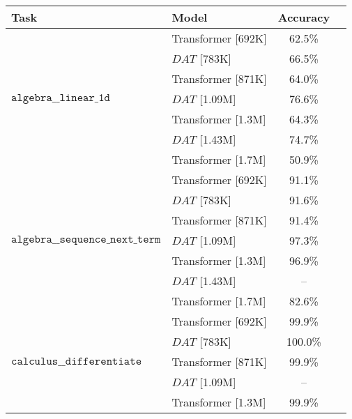 \begin{tabular}{l|l|cc}
    \toprule
    Task & Model &  Accuracy \\
    \midrule
    \multirow{7}{*}{$\texttt{algebra\_\_linear\_1d}$} & Transformer [692K] &                    62.5\% \\
                                     & $DAT$ [783K] &                    66.5\% \\
                                     & Transformer [871K] &                    64.0\% \\
                                     & $DAT$ [1.09M] &                    76.6\% \\
                                     & Transformer [1.3M] &                    64.3\% \\
                                     & $DAT$ [1.43M] &                    74.7\% \\
                                     & Transformer [1.7M] &                    50.9\% \\
    \cline{1-3}
    \multirow{7}{*}{$\texttt{algebra\_\_sequence\_next\_term}$} & Transformer [692K] &                    91.1\% \\
                                     & $DAT$ [783K] &                    91.6\% \\
                                     & Transformer [871K] &                    91.4\% \\
                                     & $DAT$ [1.09M] &                    97.3\% \\
                                     & Transformer [1.3M] &                    96.9\% \\
                                     & $DAT$ [1.43M] &                        -- \\
                                     & Transformer [1.7M] &                    82.6\% \\
    \cline{1-3}
    \multirow{7}{*}{$\texttt{calculus\_\_differentiate}$} & Transformer [692K] &                    99.9\% \\
                                     & $DAT$ [783K] &                   100.0\% \\
                                     & Transformer [871K] &                    99.9\% \\
                                     & $DAT$ [1.09M] &                        -- \\
                                     & Transformer [1.3M] &                    99.9\% \\

\end{tabular}
